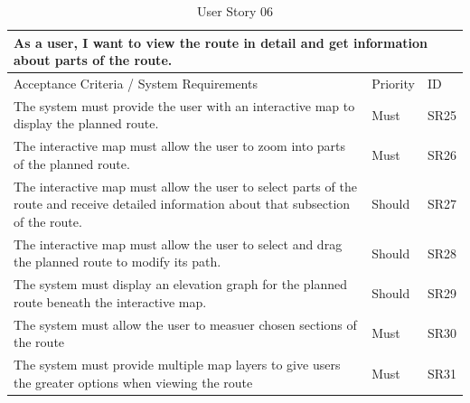 \begin{table}[!htb]
\caption{User Story 06}
\label{tab:user-story-06}
\begin{tabular}{ p{11cm} p{1cm}  p{1cm} }
\hline
\multicolumn{3}{p{13cm}}{As a user, I want to view the route in detail and get information about parts of the route.}\\ 
\hline
Acceptance Criteria / System Requirements & Priority & ID\\
\hline
The system must provide the user with an interactive map to display the planned route. & Must & SR25 \\
The interactive map must allow the user to zoom into parts of the planned route. & Must & SR26\\
The interactive map must allow the user to select parts of the route and receive detailed information about that subsection of the route. & Should & SR27\\
The interactive map must allow the user to select and drag the planned route to modify its path. & Should & SR28\\ 
The system must display an elevation graph for the planned route beneath the interactive map. & Should & SR29\\
The system must allow the user to measuer chosen sections of the route & Must & SR30\\
The system must provide multiple map layers to give users the greater options when viewing the route & Must & SR31\\ 
\hline
\end{tabular}
\end{table}

